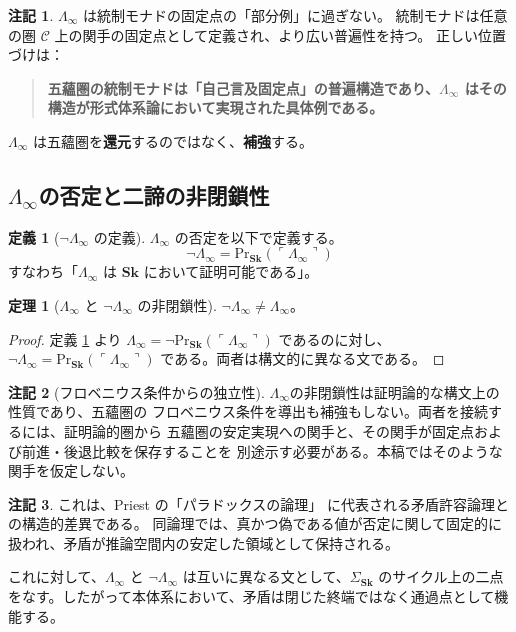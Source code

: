 \documentclass[11pt,a4paper]{ltjsarticle}
\theoremstyle{definition}
\newtheorem{definition}{定義}[section]
\newtheorem{theorem}{定理}[section]
\newtheorem{remark}{注記}[section]
\newcommand{\Sk}{\mathbf{Sk}}
\newcommand{\PrSk}{\mathrm{Pr}_{\Sk}}
\newcommand{\LawvereInfinity}{\Lambda_\infty}
\newcommand{\SigmaSk}{\Sigma_{\Sk}}
\begin{document}
\begin{remark}
$\LawvereInfinity$ は統制モナドの固定点の「部分例」に過ぎない。
統制モナドは任意の圏 $\mathcal{C}$ 上の関手の固定点として定義され、より広い普遍性を持つ。
正しい位置づけは：
\begin{quote}
\textbf{五蘊圏の統制モナドは「自己言及固定点」の普遍構造であり、$\LawvereInfinity$ はその構造が形式体系論において実現された具体例である。}
\end{quote}
$\LawvereInfinity$ は五蘊圏を\textbf{還元}するのではなく、\textbf{補強}する。
\end{remark}

\subsection{\texorpdfstring{$\LawvereInfinity$}{Lambda-infinity}の否定と二諦の非閉鎖性}

\begin{definition}[$\neg\LawvereInfinity$ の定義]\label{def:neg-e-infinity}
$\LawvereInfinity$ の否定を以下で定義する。
\begin{equation}
\neg\LawvereInfinity = \PrSk(\ulcorner \LawvereInfinity \urcorner)
\end{equation}
すなわち「$\LawvereInfinity$ は $\Sk$ において証明可能である」。
\end{definition}

\begin{theorem}[$\LawvereInfinity$ と $\neg\LawvereInfinity$ の非閉鎖性]\label{thm:non-closure}
$\neg\LawvereInfinity \neq \LawvereInfinity$。
\end{theorem}
\begin{proof}
定義 \ref{def:neg-e-infinity} より $\LawvereInfinity = \neg\PrSk(\ulcorner \LawvereInfinity \urcorner)$ であるのに対し、$\neg\LawvereInfinity = \PrSk(\ulcorner \LawvereInfinity \urcorner)$ である。両者は構文的に異なる文である。
\end{proof}

\begin{remark}[フロベニウス条件からの独立性]
$\LawvereInfinity$の非閉鎖性は証明論的な構文上の性質であり、五蘊圏の
フロベニウス条件を導出も補強もしない。両者を接続するには、証明論的圏から
五蘊圏の安定実現への関手と、その関手が固定点および前進・後退比較を保存することを
別途示す必要がある。本稿ではそのような関手を仮定しない。
\end{remark}

\begin{remark}
これは、Priest の「パラドックスの論理」\cite{Priest1979} に代表される矛盾許容論理との構造的差異である。
同論理では、真かつ偽である値が否定に関して固定的に扱われ、矛盾が推論空間内の安定した領域として保持される。

これに対して、$\LawvereInfinity$ と $\neg\LawvereInfinity$ は互いに異なる文として、$\SigmaSk$ のサイクル上の二点をなす。したがって本体系において、矛盾は閉じた終端ではなく通過点として機能する。
\end{remark}
\end{document}
